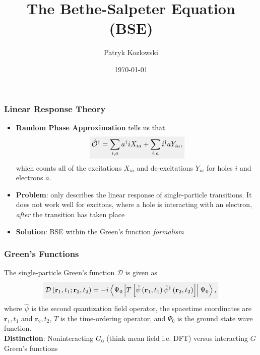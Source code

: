 \documentclass{beamer}
\title{\textcolor{caltechorange}{The Bethe-Salpeter Equation (BSE)}}
\institute{Caltech}
\author{\textcolor{caltechgray}{Patryk Kozlowski}}
\date{\today}
\newcommand{\highlight}[1]{\colorbox{caltechgray!10}{$\displaystyle#1$}}
\begin{document}
\begin{frame}
    \titlepage
\end{frame}

\begin{frame}
    \frametitle{\textcolor{caltechorange}{Linear Response Theory}}
    \begin{itemize}
        \item \textbf{Random Phase Approximation} tells us that\autocite{casida_progress_2012}
        \begin{equation}
        \highlight{\hat{\mathcal{O}}^{\dagger}=\sum_{i, a} a^{\dagger} i X_{i a}+\sum_{i, a} i^{\dagger} a Y_{i a},}
        \label{eq:operator}
        \end{equation}
        which counts all of the excitations $X_{ia}$ and de-excitations $Y_{ia}$ for holes $i$ and electrons $a$.
        \pause
        \item \textbf{Problem}: only describes the linear response of single-particle transitions. It does not work well for excitons, where a hole is interacting with an electron, \emph{after} the transition has taken place
        \pause
        \item \textbf{Solution}: BSE within the Green's function \emph{formalism}
    \end{itemize}
\end{frame}

\begin{frame}
    \frametitle{\textcolor{caltechorange}{Green's Functions}}
    The single-particle Green's function $\mathcal{D}$ is given as
    \begin{equation}
    \highlight{\mathcal{D}\left(\mathbf{r}_1, t_1 ; \mathbf{r}_2, t_2\right)=-i\left\langle\Psi_0\left|T\left[\hat{\psi }\left(\mathbf{r}_1, t_1\right) \hat{\psi}^{\dagger}\left(\mathbf{r}_2, t_2\right)\right]\right| \Psi_0\right\rangle,}
    \label{eq:greens}
    \end{equation}
    where $\hat{\psi}$ is the second quantization field operator, the spacetime coordinates are $\mathbf{r}_1, t_1$ and $\mathbf{r}_2, t_2$, $T$ is the time-ordering operator, and $\Psi_0$ is the ground state wave function.\\
    \pause
    \textbf{Distinction}: Noninteracting $G_0$ (think mean field i.e. DFT) versus interacting $G$ Green's functions
\end{frame}
\end{document}
